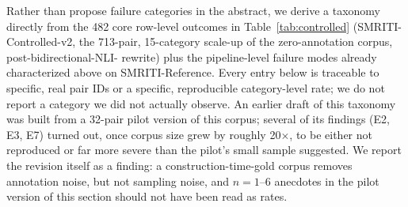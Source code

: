 Rather than propose failure categories in the abstract, we derive a
taxonomy directly from the 482 core row-level outcomes in
Table~\ref{tab:controlled} (SMRITI-Controlled-v2, the 713-pair,
15-category scale-up of the zero-annotation corpus, post-bidirectional-NLI-
rewrite) plus the pipeline-level failure modes already characterized
above on SMRITI-Reference. Every entry below is traceable to specific,
real pair IDs or a specific, reproducible category-level rate; we do not
report a category we did not actually observe. An earlier draft of this
taxonomy was built from a 32-pair pilot version of this corpus; several
of its findings (E2, E3, E7) turned out, once corpus size grew by roughly
20$\times$, to be either not reproduced or far more severe than the
pilot's small sample suggested. We report the revision itself as a
finding: a construction-time-gold corpus removes annotation noise, but
not sampling noise, and $n=1$--6 anecdotes in the pilot version of this
section should not have been read as rates.

